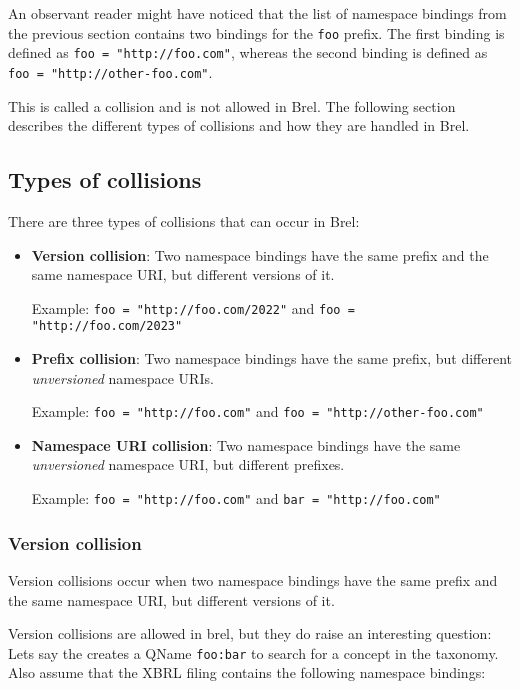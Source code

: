 An observant reader might have noticed that the list of namespace bindings from the previous section contains two bindings for the \texttt{foo} prefix.
The first binding is defined as \texttt{foo = "http://foo.com"}, whereas the second binding is defined as \texttt{foo = "http://other-foo.com"}.

This is called a collision and is not allowed in Brel.
The following section describes the different types of collisions and how they are handled in Brel.

\subsection{Types of collisions}

There are three types of collisions that can occur in Brel:

\begin{itemize}
    \item \textbf{Version collision}: Two namespace bindings have the same prefix and the same namespace URI, but different versions of it.
    
    Example: \texttt{foo = "http://foo.com/2022"} and \texttt{foo = "http://foo.com/2023"}
    \item \textbf{Prefix collision}: Two namespace bindings have the same prefix, but different \textit{unversioned} namespace URIs.
    
    Example: \texttt{foo = "http://foo.com"} and \texttt{foo = "http://other-foo.com"}
    \item \textbf{Namespace URI collision}: Two namespace bindings have the same \textit{unversioned} namespace URI, but different prefixes.
    
    Example: \texttt{foo = "http://foo.com"} and \texttt{bar = "http://foo.com"}
\end{itemize}

\subsubsection{Version collision}

Version collisions occur when two namespace bindings have the same prefix and the same namespace URI, but different versions of it.

Version collisions are allowed in brel, but they do raise an interesting question:
Lets say the creates a QName \texttt{foo:bar} to search for a concept in the taxonomy. 
Also assume that the XBRL filing contains the following namespace bindings:

